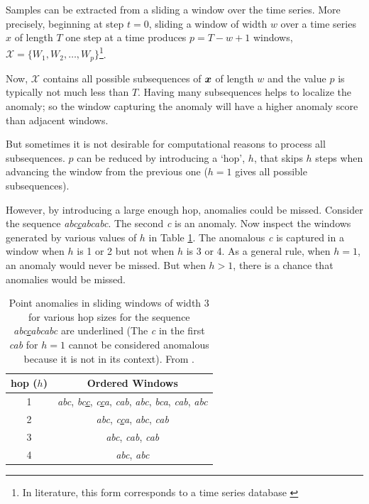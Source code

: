 Samples can be extracted from a sliding a window over the time series. More precisely, beginning at step $t=0$, sliding a window of width $w$ over a time series $x$ of length $T$ one step at a time produces $p=T-w+1$ windows, $\mathcal{X}=\{W_1,W_2,\ldots,W_p\}$\footnote{In literature, this form corresponds to a time series database \cite{Gupta2013}}.

Now, $\mathcal{X}$ contains all possible subsequences of $\boldsymbol{x}$ of length $w$ and the value $p$ is typically not much less than $T$. Having many subsequences helps to localize the anomaly; so the window capturing the anomaly will have a higher anomaly score than adjacent windows.

But sometimes it is not desirable for computational reasons to process all subsequences. $p$ can be reduced by introducing a `hop', $h$, that skips $h$ steps when advancing the window from the previous one ($h=1$ gives all possible subsequences).

However, by introducing a large enough hop, anomalies could be missed. Consider the sequence \emph{abc\underline{c}abcabc}. The second \emph{c} is an anomaly. Now inspect the windows generated by various values of $h$ in Table \ref{tbl:hop}. The anomalous \emph{c} is captured in a window when $h$ is 1 or 2 but not when $h$ is 3 or 4. As a general rule, when $h=1$, an anomaly would never be missed. But when $h>1$, there is a chance that anomalies would be missed.

\begin{table}[h]
  \centering
  \begin{tabular}{|c|c|}
    \hline
    hop ($h$) & Ordered Windows \\
    \hline
    \hline
    1 & \emph{abc},
        \emph{bc\underline{c}}, 
        \emph{c\underline{c}a}, 
        \emph{cab},
        \emph{abc}, 
        \emph{bca},
        \emph{cab},
        \emph{abc} \\
    \hline
    2 & \emph{abc},
        \emph{c\underline{c}a},
        \emph{abc},
        \emph{cab} \\
    \hline
    3 & \emph{abc}, 
        \emph{cab},
        \emph{cab} \\
    \hline
    4 & \emph{abc}, 
        \emph{abc} \\
    \hline
  \end{tabular}
  \caption[Point anomalies in sliding windows of various hop sizes]{Point anomalies in sliding windows of width 3 for various hop sizes for the sequence \emph{abc\underline{c}abcabc} are underlined (The \emph{c} in the first \emph{cab} for $h=1$ cannot be considered anomalous because it is not in its context). From \cite{Cheboli2010}.}
  \label{tbl:hop}
\end{table}

